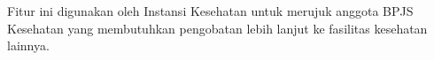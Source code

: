 Fitur ini digunakan oleh Instansi Kesehatan untuk merujuk anggota BPJS Kesehatan yang membutuhkan pengobatan lebih lanjut ke fasilitas kesehatan lainnya.